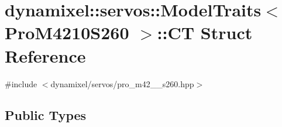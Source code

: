 \hypertarget{structdynamixel_1_1servos_1_1_model_traits_3_01_pro_m4210_s260_01_4_1_1_c_t}{}\section{dynamixel\+:\+:servos\+:\+:Model\+Traits$<$ Pro\+M4210\+S260 $>$\+:\+:CT Struct Reference}
\label{structdynamixel_1_1servos_1_1_model_traits_3_01_pro_m4210_s260_01_4_1_1_c_t}


{\ttfamily \#include $<$dynamixel/servos/pro\+\_\+m42\+\_\+\_\+s260.\+hpp$>$}

\subsection*{Public Types}
